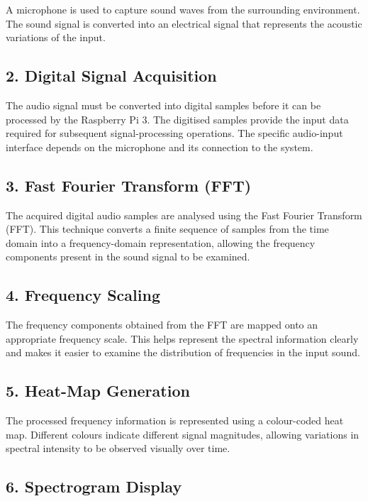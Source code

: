 \documentclass[12pt,a4paper]{article}
\begin{document}
A microphone is used to capture sound waves from the
surrounding environment. The sound signal is converted
into an electrical signal that represents the acoustic
variations of the input.

\subsection*{2. Digital Signal Acquisition}

The audio signal must be converted into digital samples
before it can be processed by the Raspberry Pi 3.
The digitised samples provide the input data required
for subsequent signal-processing operations. The
specific audio-input interface depends on the
microphone and its connection to the system.

\subsection*{3. Fast Fourier Transform (FFT)}

The acquired digital audio samples are analysed using
the Fast Fourier Transform (FFT). This technique
converts a finite sequence of samples from the time
domain into a frequency-domain representation,
allowing the frequency components present in the
sound signal to be examined.

\subsection*{4. Frequency Scaling}

The frequency components obtained from the FFT are
mapped onto an appropriate frequency scale. This
helps represent the spectral information clearly and
makes it easier to examine the distribution of
frequencies in the input sound.

\subsection*{5. Heat-Map Generation}

The processed frequency information is represented
using a colour-coded heat map. Different colours
indicate different signal magnitudes, allowing
variations in spectral intensity to be observed
visually over time.

\subsection*{6. Spectrogram Display}
\end{document}
